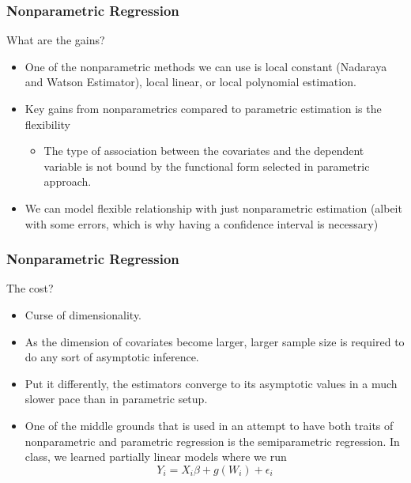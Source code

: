 \documentclass{beamer}
\begin{document}
\begin{frame}
\frametitle{Nonparametric Regression}
What are the gains?
\begin{itemize}
\item One of the nonparametric methods we can use is local constant (Nadaraya and Watson Estimator), local linear, or local polynomial estimation.
\item Key gains from nonparametrics compared to parametric estimation is the flexibility 
\begin{itemize}
\item The type of association between the covariates and the dependent variable is not bound by the functional form selected in parametric approach.
\end{itemize}
\item We can model flexible relationship with just nonparametric estimation (albeit with some errors, which is why having a confidence interval is necessary)
\end{itemize}
\end{frame}

\begin{frame}
\frametitle{Nonparametric Regression}
The cost?
\begin{itemize}
\item Curse of dimensionality.
\item As the dimension of covariates become larger, larger sample size is required to do any sort of asymptotic inference.
\item Put it differently, the estimators converge to its asymptotic values in a much slower pace than in parametric setup.

\item One of the middle grounds that is used in an attempt to have both traits of nonparametric and parametric regression is the semiparametric regression. In class, we learned partially linear models where we run
\[
Y_i = X_i\beta + g(W_i)+\epsilon_i
\]
\end{itemize}
\end{frame}
\end{document}
